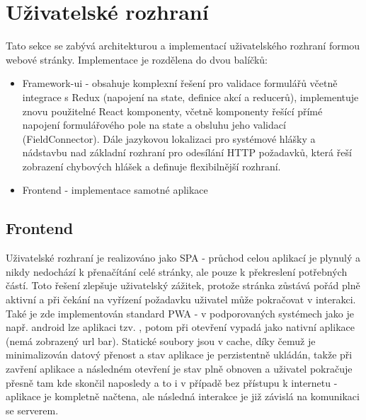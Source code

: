 
\section{Uživatelské rozhraní}
Tato sekce se zabývá architekturou a implementací uživatelského rozhraní formou webové stránky. Implementace je rozdělena do dvou balíčků:
\begin{itemize}
    \item Framework-ui - obsahuje komplexní řešení pro validace formulářů včetně integrace s Redux (napojení na state, definice akcí a reducerů), implementuje znovu použitelné React komponenty, včetně komponenty řešící přímé napojení formulářového pole na state a obsluhu jeho validací (FieldConnector). Dále jazykovou lokalizaci pro systémové hlášky a nádstavbu nad základní rozhraní pro odesílání HTTP požadavků, která řeší zobrazení chybových hlášek a definuje flexibilnější rozhraní.
    \item Frontend - implementace samotné aplikace
\end{itemize}

\subsection{Frontend}
Uživatelské rozhraní je realizováno jako SPA - průchod celou aplikací je plynulý a nikdy nedochází k přenačítání celé stránky, ale pouze k překreslení potřebných částí. Toto řešení zlepšuje uživatelský zážitek, protože stránka zůstává pořád plně aktivní a při čekání na vyřízení požadavku uživatel může pokračovat v interakci. Také je zde implementován standard PWA - v podporovaných systémech jako je např. android lze aplikaci tzv. , potom při otevření vypadá jako nativní aplikace (nemá zobrazený url bar). Statické soubory jsou v cache, díky čemuž je minimalizován datový přenost a stav aplikace je perzistentně ukládán, takže při zavření aplikace a následném otevření je stav plně obnoven a uživatel pokračuje přesně tam kde skončil naposledy a to i v případě bez přístupu k internetu - aplikace je kompletně načtena, ale následná interakce je již závislá na komunikaci se serverem.

